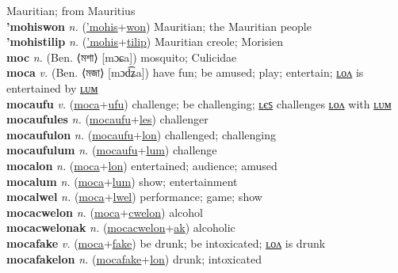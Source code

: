 Mauritian; from Mauritius \label{'mohisak} \\
\textbf{'mohiswon} \textit{n.} (\hyperref['mohis]{'mohis}+\hyperref[won]{won})
Mauritian; the Mauritian people \label{'mohiswon} \\
\textbf{'mohistilip} \textit{n.} (\hyperref['mohis]{'mohis}+\hyperref[tilip]{tilip})
Mauritian creole; Morisien \label{'mohistilip} \\
\textbf{moc} \textit{n.} (Ben. ⟨মশা⟩ [mɔɕa])
mosquito; Culicidae \label{moc} \\
\textbf{moca} \textit{v.} (Ben. ⟨মজা⟩ [mɔd͡ʑa])
have fun; be amused; play; entertain; \hyperref[mocalon]{ʟᴏᴧ} is entertained by \hyperref[mocalum]{ʟᴜᴍ} \label{moca} \\
\textbf{mocaufu} \textit{v.} (\hyperref[moca]{moca}+\hyperref[ufu]{ufu})
challenge; be challenging; \hyperref[mocaufules]{ʟєꜱ} challenges \hyperref[mocaufulon]{ʟᴏᴧ} with \hyperref[mocaufulum]{ʟᴜᴍ} \label{mocaufu} \\
\textbf{mocaufules} \textit{n.} (\hyperref[mocaufu]{mocaufu}+\hyperref[les]{les})
challenger \label{mocaufules} \\
\textbf{mocaufulon} \textit{n.} (\hyperref[mocaufu]{mocaufu}+\hyperref[lon]{lon})
challenged; challenging \label{mocaufulon} \\
\textbf{mocaufulum} \textit{n.} (\hyperref[mocaufu]{mocaufu}+\hyperref[lum]{lum})
challenge \label{mocaufulum} \\
\textbf{mocalon} \textit{n.} (\hyperref[moca]{moca}+\hyperref[lon]{lon})
entertained; audience; amused \label{mocalon} \\
\textbf{mocalum} \textit{n.} (\hyperref[moca]{moca}+\hyperref[lum]{lum})
show; entertainment \label{mocalum} \\
\textbf{mocalwel} \textit{n.} (\hyperref[moca]{moca}+\hyperref[lwel]{lwel})
performance; game; show \label{mocalwel} \\
\textbf{mocacwelon} \textit{n.} (\hyperref[moca]{moca}+\hyperref[cwelon]{cwelon})
alcohol \label{mocacwelon} \\
\textbf{mocacwelonak} \textit{n.} (\hyperref[mocacwelon]{mocacwelon}+\hyperref[ak]{ak})
alcoholic \label{mocacwelonak} \\
\textbf{mocafake} \textit{v.} (\hyperref[moca]{moca}+\hyperref[fake]{fake})
be drunk; be intoxicated; \hyperref[mocafakelon]{ʟᴏᴧ} is drunk \label{mocafake} \\
\textbf{mocafakelon} \textit{n.} (\hyperref[mocafake]{mocafake}+\hyperref[lon]{lon})
drunk; intoxicated \label{mocafakelon} \\
